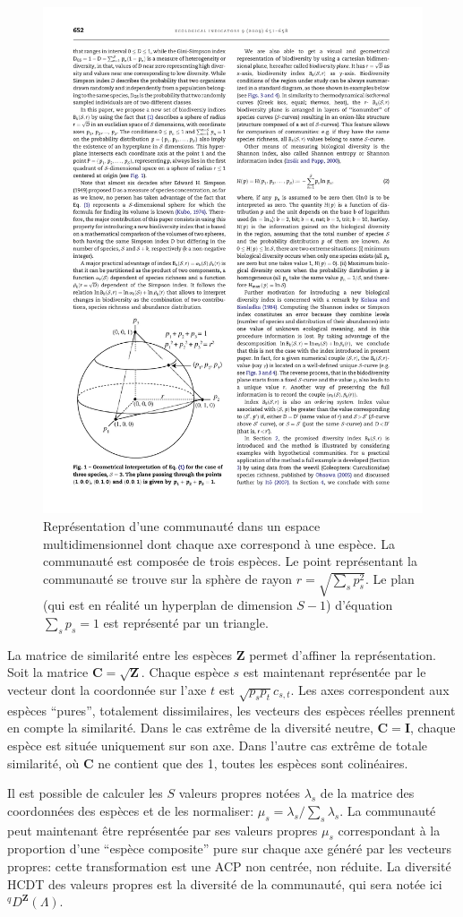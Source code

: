 \documentclass[
  11pt,
  french,
  a4paper,
  extrafontsizes,onecolumn,openright
  ]{memoir}
\begin{document}
\begin{figure}

{\centering \includegraphics[width=0.5\linewidth]{images/Campos2009} 

}

\caption{Représentation d'une communauté dans un espace multidimensionnel dont chaque axe correspond à une espèce. La communauté est composée de trois espèces. Le point représentant la communauté se trouve sur la sphère de rayon \(r=\sqrt{\sum_s{p_s^2}}\). Le plan (qui est en réalité un hyperplan de dimension \(S-1\)) d'équation \(\sum_s{p_s}=1\) est représenté par un triangle.}\label{fig:Campos2009}
\end{figure}

\normalsize

La matrice de similarité entre les espèces \(\mathbf{Z}\) permet d'affiner la représentation.
Soit la matrice \(\mathbf{C}=\sqrt{\mathbf{Z}}\).
Chaque espèce \(s\) est maintenant représentée par le vecteur dont la coordonnée sur l'axe \(t\) est \(\sqrt{p_s p_t}c_{s,t}\).
Les axes correspondent aux espèces \enquote{pures}, totalement dissimilaires, les vecteurs des espèces réelles prennent en compte la similarité.
Dans le cas extrême de la diversité neutre, \(\mathbf{C}=\mathbf{I}\), chaque espèce est située uniquement sur son axe.
Dans l'autre cas extrême de totale similarité, où \(\mathbf{C}\) ne contient que des 1, toutes les espèces sont colinéaires.

Il est possible de calculer les \(S\) valeurs propres notées \(\lambda_s\) de la matrice des coordonnées des espèces et de les normaliser: \(\mu_s={\lambda_s}/{\sum_s{\lambda_s}}\).
La communauté peut maintenant être représentée par ses valeurs propres \(\mu_s\) correspondant à la proportion d'une \enquote{espèce composite} pure sur chaque axe généré par les vecteurs propres: cette transformation est une ACP non centrée, non réduite.
La diversité HCDT des valeurs propres est la diversité de la communauté, qui sera notée ici \(^q\!D^{\mathbf{Z}}(\Lambda)\).
\end{document}
